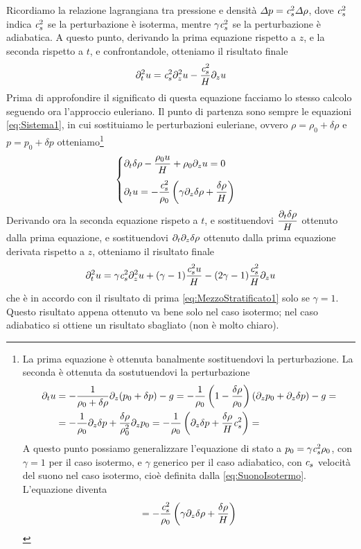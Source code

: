 Ricordiamo la relazione lagrangiana tra pressione e densità $\Delta p = \textit{c}_{s}^2 \Delta\rho$, dove $\textit{c}_{s}^2$ indica $\textit{c}_{s}^2$ se la perturbazione è isoterma, mentre $\gamma \textit{c}_{s}^2$ se la perturbazione è adiabatica. A questo punto, derivando la prima equazione rispetto a $z$, e la seconda rispetto a $t$, e confrontandole, otteniamo il risultato finale
\begin{equation}
\partial_t^2 u = \textit{c}_{s}^2 \partial_z^2 u - \dfrac{\textit{c}_{s}^2}{H}\partial_z u \label{eq:MezzoStratificato1}
\end{equation}
Prima di approfondire il significato di questa equazione facciamo lo stesso calcolo seguendo ora l'approccio euleriano.
Il punto di partenza sono sempre le equazioni \ref{eq:Sistema1}, in cui sostituiamo le perturbazioni euleriane, ovvero 
$\rho = \rho_0 + \delta \rho$ e $p= p_0 + \delta p$ otteniamo\footnote{La prima equazione è ottenuta banalmente sostituendovi la perturbazione. La seconda è ottenuta da sostutuendovi la perturbazione 
\begin{align*}
\partial_t u &= -\dfrac{1}{\rho_0+\delta\rho}\partial_z (p_0+\delta p) -g = -\dfrac{1}{\rho_0}\left( 1- \dfrac{\delta\rho}{\rho_0} \right) \left( \partial_z p_0 + \partial_z \delta p \right) - g = \\
&= -\dfrac{1}{\rho_0} \partial_z \delta p + \dfrac{\delta \rho}{\rho_0^2}\partial_z p_0 = -\dfrac{1}{\rho_0} \left( \partial_z \delta p + \dfrac{\delta \rho}{H} \textit{c}_{s}^2 \right) = \\
\end{align*}
A questo punto possiamo generalizzare l'equazione di stato a $p_0 = \gamma \textit{c}_{s}^2 \rho_0$, con $\gamma=1$ per il caso isotermo, e $\gamma$ generico per il caso adiabatico, con $\textit{c}_{s}$ velocità del suono nel caso isotermo, cioè definita dalla \ref{eq:SuonoIsotermo}. L'equazione diventa
\begin{align*}
= - \dfrac{\textit{c}_{s}^2}{\rho_0} \left( \gamma \partial_z \delta \rho + \dfrac{\delta \rho}{H} \right)
\end{align*}
}
\begin{equation}
\begin{cases}
\partial_t \delta \rho - \dfrac{\rho_0 u}{H} + \rho_0 \partial_z u =0 \\[10pt]
\partial_t u = - \dfrac{\textit{c}_{s}^2}{\rho_0} \left( \gamma \partial_z \delta \rho + \dfrac{\delta \rho}{H} \right)
\end{cases}
\end{equation}
Derivando ora la seconda equazione rispeto a $t$, e sostituendovi $\dfrac{\partial_t \delta \rho}{H}$ ottenuto dalla prima equazione, e sostituendovi  $\partial_t\partial_z\delta\rho$ ottenuto dalla prima equazione derivata rispetto a $z$, otteniamo il risultato finale
\begin{equation}
\partial_t^2 u = \gamma \textit{c}_{s}^2 \partial_z^2 u + (\gamma - 1) \dfrac{\textit{c}_{s}^2 u}{H} - (2\gamma -1) \dfrac{\textit{c}_{s}^2}{H} \partial_z u \label{eq:MezzoStratificato2}
\end{equation}
che è in accordo con il risultato di prima \ref{eq:MezzoStratificato1} solo se $\gamma=1$. Questo risultato appena ottenuto va bene solo nel caso isotermo; nel caso adiabatico si ottiene un risultato sbagliato (non è molto chiaro).

